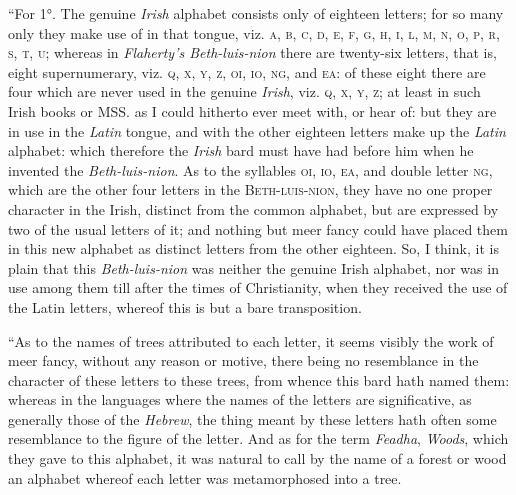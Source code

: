 \documentclass[11pt,oneside]{memoir}
\begin{document}
``For 1°. The genuine \textit{Irish} alphabet consists only of eighteen letters; for so many only they make use of in that tongue, viz. \textsc{a}, \textsc{b}, \textsc{c}, \textsc{d}, \textsc{e}, \textsc{f}, \textsc{g}, \textsc{h}, \textsc{i}, \textsc{l}, \textsc{m}, \textsc{n}, \textsc{o}, \textsc{p}, \textsc{r}, \textsc{s}, \textsc{t}, \textsc{u}; 
whereas in \textit{Flaherty's Beth-luis-nion} there are twenty-six letters, that is, eight supernumerary, viz. \textsc{q}, \textsc{x}, \textsc{y}, \textsc{z}, \textsc{oi}, \textsc{io}, \textsc{ng}, and \textsc{ea}: of these eight there are four which are never used in the genuine \textit{Irish}, viz. 
\textsc{q}, \textsc{x}, \textsc{y}, \textsc{z}; at least in such Irish books or MSS. as I could hitherto ever meet with, or hear of: but they are in use in the \textit{Latin} tongue, and with the other eighteen letters make up the \textit{Latin} alphabet: which therefore the \textit{Irish} bard must have had before him when he invented the \textit{Beth-luis-nion}.
As to the syllables \textsc{oi}, \textsc{io}, \textsc{ea}, and double letter \textsc{ng}, which are the other four letters in the \textsc{Beth-luis-nion}, they have no one proper character in the Irish, distinct from the common alphabet, but are expressed by two of the usual letters of it; and nothing but meer fancy could have placed them in this new alphabet as distinct letters from the other eighteen.
So, I think, it is plain that this \textit{Beth-luis-nion} was neither the genuine Irish alphabet, nor was in use among them till after the times of Christianity, when they received the use of the Latin letters, whereof this is but a bare transposition.


``As to the names of trees attributed to each letter, it seems visibly the work of meer fancy, without any reason or motive, there being no resemblance in the character of these letters to these trees, from whence this bard hath named them: whereas in the languages where the names of the letters are 
significative, as generally those of the \textit{Hebrew}, the thing meant by these letters hath often some resemblance to the figure of the letter.
And as for the term \textit{Feadha}, \textit{Woods}, which they gave to this alphabet, it was natural to call by the name of a forest or wood an alphabet whereof each letter was metamorphosed into a tree. 
\end{document}
